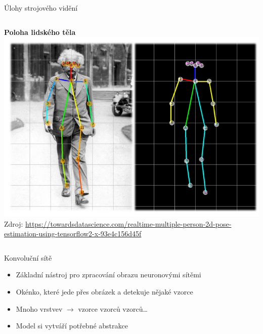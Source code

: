 \documentclass[aspectratio=169,dvipsnames]{beamer}
\begin{document}
\begin{frame}{Úlohy strojového vidění}
{\begin{columns}[t]
        \centering \textbf{Poloha lidského těla} \\[1ex]
        \includegraphics[width=.98\textwidth]{img/pose_detection.png} \\
        {\tiny Zdroj: \url{https://towardsdatascience.com/realtime-multiple-person-2d-pose-estimation-using-tensorflow2-x-93e4c156d45f}}

    \end{columns}}


\end{frame}


\begin{frame}{Konvoluční sítě}

    \begin{minipage}{.45\textwidth}
        \begin{itemize}[<+->]

            \item Základní nástroj pro zpracování obrazu neuronovými sítěmi

            \item Okénko, které jede přes obrázek a detekuje nějaké vzorce

            \item Mnoho vrstvev $\rightarrow$ vzorce vzorců vzorců\ldots

            \item Model si vytváří potřebné abstrakce

        \end{itemize}
    \end{minipage}\begin{minipage}{.45\textwidth}
        \centering
        \scalebox{0.7}{}
    \end{minipage}

\end{frame}
\end{document}
